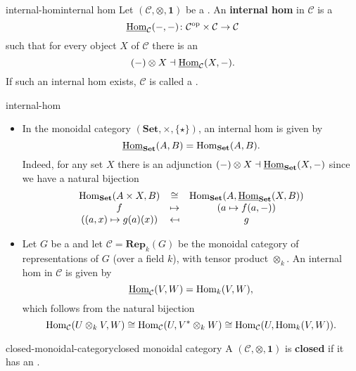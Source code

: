 \begin{topic}{internal-hom}{internal hom}
    Let $(\mathcal{C}, \otimes, \textbf{1})$ be a  . An \textbf{internal hom} in $\mathcal{C}$ is a 
    \[ \operatorname{\underline{Hom}}_\mathcal{C}(-, -) \colon \mathcal{C}^\textup{op} \times \mathcal{C} \to \mathcal{C} \]
    such that for every object $X$ of $\mathcal{C}$ there is an 
    \[ (-) \otimes X \dashv \operatorname{\underline{Hom}}_\mathcal{C}(X, -) . \]
    If such an internal hom exists, $\mathcal{C}$ is called a .
\end{topic}

\begin{example}{internal-hom}
    \begin{itemize}
        \item In the monoidal category $(\textbf{Set}, \times, \{ \star \})$, an internal hom is given by
        \[ \operatorname{\underline{Hom}}_\textbf{Set}(A, B) = \operatorname{Hom}_\textbf{Set}(A, B) . \]
        Indeed, for any set $X$ there is an adjunction $(-) \otimes X \dashv \operatorname{\underline{Hom}}_\textbf{Set}(X, -)$ since we have a natural bijection
        \[ \begin{array}{ccc}
            \operatorname{Hom}_\textbf{Set}(A \times X, B) & \cong & \operatorname{Hom}_\textbf{Set}(A, \operatorname{\underline{Hom}}_\textbf{Set}(X, B)) \\
            f & \mapsto & (a \mapsto f(a, -)) \\
            ((a, x) \mapsto g(a)(x)) & \mapsfrom & g
        \end{array} \]
        \item Let $G$ be a  and let $\mathcal{C} = \textbf{Rep}_k(G)$ be the monoidal category of representations of $G$ (over a field $k$), with tensor product $\otimes_k$. An internal hom in $\mathcal{C}$ is given by
        \[ \operatorname{\underline{Hom}}_\mathcal{C}(V, W) = \operatorname{Hom}_{k}(V, W) , \]
        which follows from the natural bijection
        \[ \operatorname{Hom}_\mathcal{C}(U \otimes_k V, W) \cong \operatorname{Hom}_\mathcal{C}(U, V^* \otimes_k W) \cong \operatorname{Hom}_\mathcal{C}(U, \operatorname{Hom}_k(V, W)) . \]
    \end{itemize}
\end{example}

\begin{topic}{closed-monoidal-category}{closed monoidal category}
    A   $(\mathcal{C}, \otimes, \textbf{1})$ is \textbf{closed} if it has an .
\end{topic}

